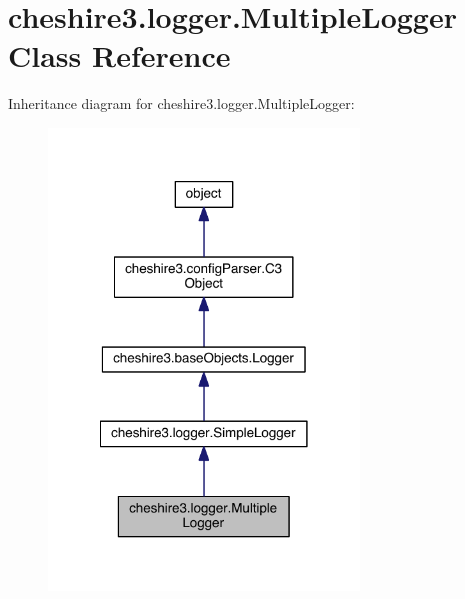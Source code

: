 \hypertarget{classcheshire3_1_1logger_1_1_multiple_logger}{\section{cheshire3.\-logger.\-Multiple\-Logger Class Reference}
\label{classcheshire3_1_1logger_1_1_multiple_logger}
}


Inheritance diagram for cheshire3.\-logger.\-Multiple\-Logger\-:
\nopagebreak
\begin{figure}[H]
\begin{center}
\leavevmode
\includegraphics[width=234pt]{classcheshire3_1_1logger_1_1_multiple_logger__inherit__graph}
\end{center}
\end{figure}


